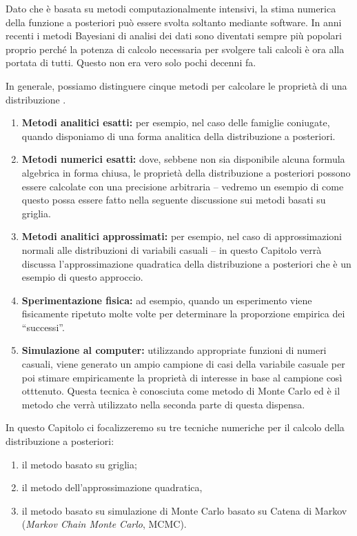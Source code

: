 \documentclass[
  11pt,
]{krantz}
\providecommand{\tightlist}{%
  \setlength{\itemsep}{0pt}\setlength{\parskip}{0pt}}
\theoremstyle{definition}
\theoremstyle{definition}
\theoremstyle{definition}
\theoremstyle{definition}
\theoremstyle{remark}
\begin{document}
Dato che è basata su metodi computazionalmente intensivi, la stima numerica della funzione a posteriori può essere svolta soltanto mediante software. In anni recenti i metodi Bayesiani di analisi dei dati sono diventati sempre più popolari proprio perché la potenza di calcolo necessaria per svolgere tali calcoli è ora alla portata di tutti. Questo non era vero solo pochi decenni fa.

In generale, possiamo distinguere cinque metodi per calcolare le proprietà di una distribuzione \citep{lunn2013bugs}.

\begin{enumerate}
\def\labelenumi{\arabic{enumi}.}
\tightlist
\item
  \textbf{Metodi analitici esatti:} per esempio, nel caso delle famiglie coniugate, quando disponiamo di una forma analitica della distribuzione a posteriori.
\item
  \textbf{Metodi numerici esatti:} dove, sebbene non sia disponibile alcuna formula algebrica in forma chiusa, le proprietà della distribuzione a posteriori possono essere calcolate con una precisione arbitraria -- vedremo un esempio di come questo possa essere fatto nella seguente discussione sui metodi basati su griglia.
\item
  \textbf{Metodi analitici approssimati:} per esempio, nel caso di approssimazioni normali alle distribuzioni di variabili casuali -- in questo Capitolo verrà discussa l'approssimazione quadratica della distribuzione a posteriori che è un esempio di questo approccio.
\item
  \textbf{Sperimentazione fisica:} ad esempio, quando un esperimento viene fisicamente ripetuto molte volte per determinare la proporzione empirica dei ``successi''.
\item
  \textbf{Simulazione al computer:} utilizzando appropriate funzioni di numeri casuali, viene generato un ampio campione di casi della variabile casuale per poi stimare empiricamente la proprietà di interesse in base al campione così otttenuto. Questa tecnica è conosciuta come metodo di Monte Carlo ed è il metodo che verrà utilizzato nella seconda parte di questa dispensa.
\end{enumerate}

In questo Capitolo ci focalizzeremo su tre tecniche numeriche per il calcolo della distribuzione a posteriori:

\begin{enumerate}
\def\labelenumi{\arabic{enumi}.}
\tightlist
\item
  il metodo basato su griglia;
\item
  il metodo dell'approssimazione quadratica,
\item
  il metodo basato su simulazione di Monte Carlo basato su Catena di Markov (\emph{Markov Chain Monte Carlo}, MCMC).
\end{enumerate}
\end{document}
